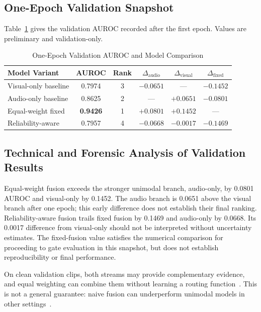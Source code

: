 \documentclass[conference]{IEEEtran}
\begin{document}
\subsection{One-Epoch Validation Snapshot}
Table~\ref{tab:preliminary} gives the validation AUROC recorded after the first epoch. Values are preliminary and validation-only.

\begin{table}[t]
\caption{One-Epoch Validation AUROC and Model Comparison}
\label{tab:preliminary}
\centering
\scriptsize
\setlength{\tabcolsep}{2.5pt}
\begin{tabular}{lccccc}
\toprule
\textbf{Model Variant} & \textbf{AUROC} & \textbf{Rank} & $\Delta_{\mathrm{audio}}$ & $\Delta_{\mathrm{visual}}$ & $\Delta_{\mathrm{fixed}}$ \\
\midrule
Visual-only baseline & 0.7974 & 3 & $-0.0651$ & --- & $-0.1452$ \\
Audio-only baseline & 0.8625 & 2 & --- & $+0.0651$ & $-0.0801$ \\
Equal-weight fixed & \textbf{0.9426} & 1 & $+0.0801$ & $+0.1452$ & --- \\
Reliability-aware & 0.7957 & 4 & $-0.0668$ & $-0.0017$ & $-0.1469$ \\
\bottomrule
\end{tabular}
\end{table}

\subsection{Technical and Forensic Analysis of Validation Results}
Equal-weight fusion exceeds the stronger unimodal branch, audio-only, by 0.0801 AUROC and visual-only by 0.1452. The audio branch is 0.0651 above the visual branch after one epoch; this early difference does not establish their final ranking. Reliability-aware fusion trails fixed fusion by 0.1469 and audio-only by 0.0668. Its 0.0017 difference from visual-only should not be interpreted without uncertainty estimates. The fixed-fusion value satisfies the numerical comparison for proceeding to gate evaluation in this snapshot, but does not establish reproducibility or final performance.

On clean validation clips, both streams may provide complementary evidence, and equal weighting can combine them without learning a routing function~\cite{zhou2021}. This is not a general guarantee: naive fusion can underperform unimodal models in other settings~\cite{muppalla2023}.
\end{document}
